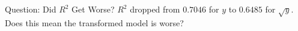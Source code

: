 \begin{frame}{Question: Did $R^2$ Get Worse?}
$R^2$ dropped from $0.7046$ for $y$ to $0.6485$ for $\sqrt{y}$. Does this mean the transformed model is worse?
\end{frame}









